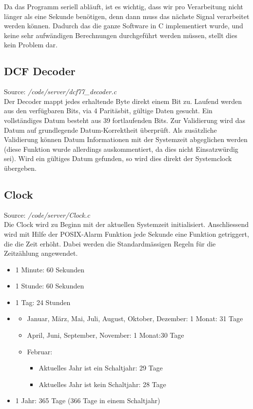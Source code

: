 Da das Programm seriell abläuft, ist es wichtig, dass wir pro Verarbeitung nicht länger als eine Sekunde benötigen, denn dann muss das nächste Signal verarbeitet werden können.
Dadurch das die ganze Software in C implementiert wurde, und keine sehr aufwändigen Berechnungen durchgeführt werden müssen, stellt dies kein Problem dar.

\subsection{DCF Decoder}
Source: \textit{/code/server/dcf77\_decoder.c}\\
Der Decoder mappt jedes erhaltende Byte direkt einem Bit zu. Laufend werden aus den verfügbaren Bits, via 4 Paritäsbit, gültige Daten gesucht. Ein vollständiges Datum besteht aus 39 fortlaufenden Bits. Zur Validierung wird das Datum auf grundlegende Datum-Korrektheit überprüft. Als zusätzliche Validierung können Datum Informationen mit der Systemzeit abgeglichen werden (diese Funktion wurde allerdings auskommentiert, da dies nicht Einsatzwürdig sei).
Wird ein gültiges Datum gefunden, so wird dies direkt der Systemclock übergeben.

\subsection{Clock}
Source: \textit{/code/server/Clock.c}\\
Die Clock wird zu Beginn mit der aktuellen Systemzeit initialisiert. Anschliessend wird mit Hilfe der POSIX-Alarm Funktion jede Sekunde eine Funktion getriggert, die die Zeit erhöht. Dabei werden die Standardmässigen Regeln für die Zeitzählung angewendet.
\begin{itemize}
\item 1 Minute: 60 Sekunden
\item 1 Stunde: 60 Sekunden
\item 1 Tag: 24 Stunden
\item 
\begin{itemize}
\item Januar, März, Mai, Juli, August, Oktober, Dezember: 1 Monat: 31 Tage 
\item April, Juni, September, November: 1 Monat:30 Tage
\item Februar:
\begin{itemize}
\item Aktuelles Jahr ist ein Schaltjahr: 29 Tage 
\item Aktuelles Jahr ist kein Schaltjahr: 28 Tage
\end{itemize}
\end{itemize}
\item 1 Jahr: 365 Tage (366 Tage in einem Schaltjahr)
\end{itemize}

